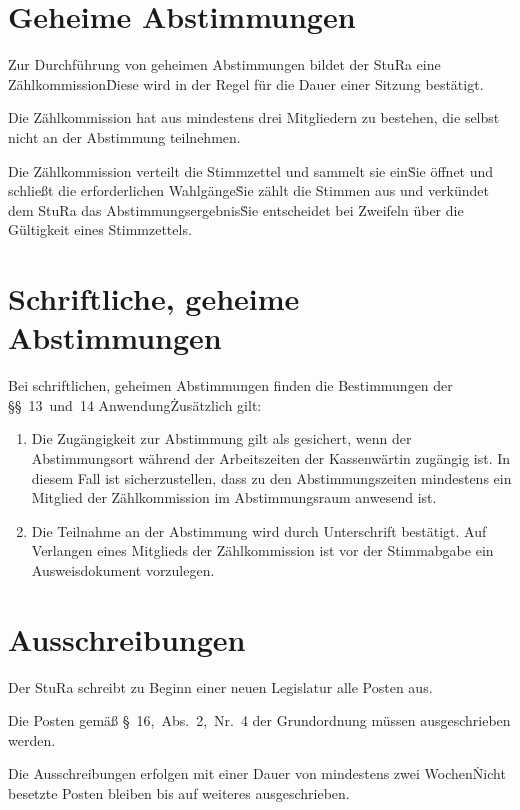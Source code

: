\begin{multicols}{2}
\section{Geheime Abstimmungen}

\Abs \Satz Zur Durchführung von geheimen Abstimmungen bildet der StuRa eine Zählkommission\. Diese wird in der Regel für die Dauer einer Sitzung bestätigt.

\Abs \Satz Die Zählkommission hat aus mindestens drei Mitgliedern zu bestehen, die selbst nicht an der Abstimmung teilnehmen.

\Abs \Satz Die Zählkommission verteilt die Stimmzettel und sammelt sie ein\. Sie öffnet und schließt die erforderlichen Wahlgänge\. Sie zählt die Stimmen aus und verkündet dem StuRa das Abstimmungsergebnis\. Sie entscheidet bei Zweifeln über die Gültigkeit eines Stimmzettels.



\section{Schriftliche, geheime Abstimmungen}

\Abs \Satz Bei schriftlichen, geheimen Abstimmungen finden die Bestimmungen der §§~13~und~14 Anwendung\. Zusätzlich gilt:
\begin{enumerate}
\item Die Zugängigkeit zur Abstimmung gilt als gesichert, wenn der Abstimmungsort während der Arbeitszeiten der Kassenwärtin zugängig ist. In diesem Fall ist sicherzustellen, dass zu den Abstimmungszeiten mindestens ein Mitglied der Zählkommission im Abstimmungsraum anwesend ist.
\item Die Teilnahme an der Abstimmung wird durch Unterschrift bestätigt. Auf Verlangen eines Mitglieds der Zählkommission ist vor der Stimmabgabe ein Ausweisdokument vorzulegen.
\end{enumerate}



\section{Ausschreibungen}

\Abs \Satz Der StuRa schreibt zu Beginn einer neuen Legislatur alle Posten aus.

\Abs \Satz Die Posten gemäß §~16,~Abs.~2,~Nr.~4 der Grundordnung müssen ausgeschrieben werden.

\Abs \Satz Die Ausschreibungen erfolgen mit einer Dauer von mindestens zwei Wochen\. Nicht besetzte Posten bleiben bis auf weiteres ausgeschrieben.


\end{multicols}
